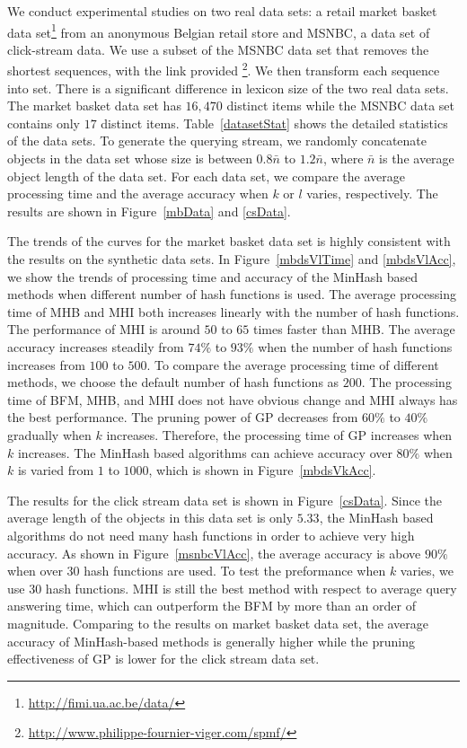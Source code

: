 We conduct experimental studies on two real data sets: a retail market basket data set\footnote{\url{http://fimi.ua.ac.be/data/}} from an anonymous Belgian retail store and MSNBC, a data set of click-stream data. We use a subset of the MSNBC data set that removes the shortest sequences, with the link provided \footnote{\url{http://www.philippe-fournier-viger.com/spmf/}}. We then transform each sequence into set. There is a significant difference in lexicon size of the two real data sets. The market basket data set has $16,470$ distinct items while the MSNBC data set contains only $17$ distinct items. Table~\ref{datasetStat} shows the detailed statistics of the data sets. To generate the querying stream, we randomly concatenate objects in the data set whose size is between $0.8\bar{n}$ to $1.2\bar{n}$, where $\bar{n}$ is the average object length of the data set. For each data set, we compare the average processing time and the average accuracy when $k$ or $l$ varies, respectively. The results are shown in Figure~\ref{mbData} and \ref{csData}. 

The trends of the curves for the market basket data set is highly consistent with the results on the synthetic data sets. In Figure~\ref{mbdsVlTime} and \ref{mbdsVlAcc}, we show the trends of processing time and accuracy of the MinHash based methods when different number of hash functions is used.  The average processing time of MHB and MHI both increases linearly with the number of hash functions.  The performance of MHI is around $50$ to $65$ times faster than MHB.  The average accuracy increases steadily from $74\%$ to $93\%$ when the number of hash functions increases from $100$ to $500$.  To compare the average processing time of different methods, we choose the default number of hash functions as $200$.  The processing time of BFM, MHB, and MHI does not have obvious change and MHI always has the best performance.  The pruning power of GP decreases from $60\%$ to $40\%$ gradually when $k$ increases.  Therefore, the processing time of GP increases when $k$ increases.  The MinHash based algorithms can achieve accuracy over $80\%$ when $k$ is varied from $1$ to $1000$, which is shown in Figure~\ref{mbdsVkAcc}. 

The results for the click stream data set is shown in Figure~\ref{csData}.  Since the average length of the objects in this data set is only $5.33$, the MinHash based algorithms do not need many hash functions in order to achieve very high accuracy.  As shown in Figure~\ref{msnbcVlAcc}, the average accuracy is above $90\%$ when over $30$ hash functions are used.  To test the preformance when $k$ varies, we use $30$ hash functions. MHI is still the best method with respect to average query answering time, which can outperform the BFM by more than an order of magnitude. Comparing to the results on market basket data set, the average accuracy of MinHash-based methods is generally higher while the pruning effectiveness of GP is lower for the click stream data set.  



